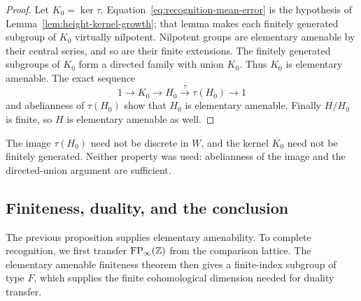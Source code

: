 \begin{proof}
Let $K_0=\ker\tau$.  Equation~\eqref{eq:recognition-mean-error} is
the hypothesis of Lemma~\ref{lem:height-kernel-growth}; that lemma
makes each finitely generated subgroup of $K_0$ virtually nilpotent.
Nilpotent groups are elementary amenable by their central series, and
so are their finite extensions.  The finitely generated subgroups of
$K_0$ form a directed family with union $K_0$.  Thus $K_0$ is elementary
amenable.  The exact sequence
\[
 1\longrightarrow K_0\longrightarrow H_0
   \overset{\tau}{\longrightarrow}\tau(H_0)\longrightarrow1
\]
and abelianness of $\tau(H_0)$ show that $H_0$ is elementary amenable.
Finally $H/H_0$ is finite, so $H$ is elementary amenable as well.
\end{proof}

The image $\tau(H_0)$ need not be discrete in $W$, and the kernel $K_0$
need not be finitely generated.  Neither property was used: abelianness
of the image and the directed-union argument are sufficient.

\subsection{Finiteness, duality, and the conclusion}

The previous proposition supplies elementary amenability.  To complete
recognition, we first transfer $\mathrm{FP}_\infty(\mathbb Z)$ from the comparison
lattice.  The elementary amenable finiteness theorem then gives a
finite-index subgroup of type $F$, which supplies the finite
cohomological dimension needed for duality transfer.

